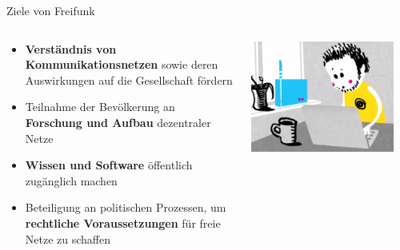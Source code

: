 \documentclass[10pt]{beamer}
\begin{document}
  \begin{frame}{Ziele von Freifunk}
    \begin{columns}[T]
     \begin{column}{5cm}
        \begin{itemize}
          \item \textbf{Verständnis von Kommunikationsnetzen} sowie deren Auswirkungen auf die Gesellschaft fördern
          \item Teilnahme der Bevölkerung an \textbf{Forschung und Aufbau} dezentraler Netze
          \item \textbf{Wissen und Software} öffentlich zugänglich machen
          \item Beteiligung an politischen Prozessen, um \textbf{rechtliche Voraussetzungen} für freie Netze zu schaffen
        \end{itemize}
      \end{column}
      \begin{column}{5cm}
        \includegraphics[width=0.9\textwidth]{images/install}
      \end{column}
    \end{columns}
  \end{frame}
\end{document}
